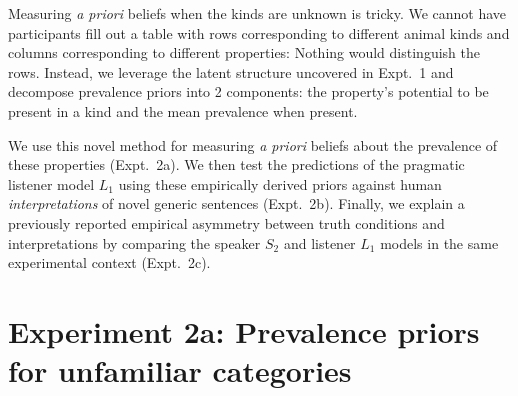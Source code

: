 \documentclass[12pt,letterpaper]{article}
\begin{document}
Measuring \emph{a priori} beliefs when the kinds are unknown is tricky.
We cannot have participants fill out a table with rows corresponding to different animal kinds and columns corresponding to different properties:  Nothing would distinguish the rows.
Instead, we leverage the latent structure uncovered in Expt.~1 and decompose prevalence priors into 2 components: the property's potential to be present in a kind and the mean prevalence when present.

We use this novel method for measuring \emph{a priori} beliefs about the prevalence of these properties (Expt.~2a).
We then test the predictions of the pragmatic listener model $L_1$ using these empirically derived priors against human \emph{interpretations} of novel generic sentences (Expt.~2b).
Finally, we explain a previously reported empirical asymmetry between truth conditions and interpretations by comparing the speaker $S_2$ and listener $L_1$ models in the same experimental context (Expt.~2c).




\section*{Experiment 2a: Prevalence priors for unfamiliar categories}

%

%
%
%
\end{document}
